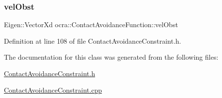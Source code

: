 \subsubsection{\texorpdfstring{vel\+Obst}{velObst}}
{\footnotesize\ttfamily Eigen\+::\+Vector\+Xd ocra\+::\+Contact\+Avoidance\+Function\+::vel\+Obst\hspace{0.3cm}{\ttfamily [protected]}}



Definition at line 108 of file Contact\+Avoidance\+Constraint.\+h.



The documentation for this class was generated from the following files\+:\begin{DoxyCompactItemize}
\item 
\hyperlink{ContactAvoidanceConstraint_8h}{Contact\+Avoidance\+Constraint.\+h}\item 
\hyperlink{ContactAvoidanceConstraint_8cpp}{Contact\+Avoidance\+Constraint.\+cpp}\end{DoxyCompactItemize}
